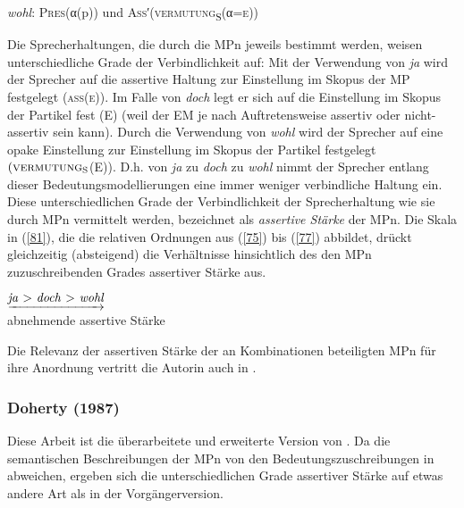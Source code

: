 \begin{exe}
	\ex\label{81} 
	\textit{wohl}: \textsc{Pres}(α(p)) und \textsc{Ass}′(\textsc{vermutung}\textsubscript{S}(α=\textsc{e}))
\end{exe}	
Die Sprecherhaltungen, die durch die MPn jeweils bestimmt werden, weisen unterschiedliche Grade der Verbindlichkeit auf: Mit der Verwendung von \textit{ja} wird der Sprecher auf die assertive Haltung zur Einstellung im Skopus der MP festgelegt (\textsc{ass}(\textsc{e})). Im Falle von \textit{doch} legt er sich auf die Einstellung im Skopus der Partikel fest (\textsc{E}) (weil der EM je nach Auftretensweise assertiv oder nicht-assertiv sein kann). Durch die Verwendung von \textit{wohl} wird der Sprecher auf eine opake Einstellung zur Einstellung im Skopus der Partikel festgelegt $(\textrm{\textsc{vermutung}}_{\textrm{S}}$(\textrm{\textsc{E}})). D.h. von \textit{ja} zu \textit{doch} zu \textit{wohl} nimmt der Sprecher entlang dieser Bedeutungsmodellierungen eine immer weniger verbindliche Haltung ein. Diese unterschiedlichen Grade der Verbindlichkeit der Sprecherhaltung wie sie durch MPn vermittelt werden, bezeichnet \citet[83]{Doherty1985} als \textit{assertive Stärke} der MPn. Die Skala in (\ref{81}), die die relativen Ordnungen aus (\ref{75}) bis (\ref{77}) abbildet, drückt gleichzeitig (absteigend) die Verhältnisse hinsichtlich des den MPn zuzu\-schreibenden Grades assertiver Stärke aus.

\begin{exe}
	\ex\label{82} 
	$\underrightarrow{\text{\textit{ja} > \textit{doch} > \textit{wohl}}}$\\
	abnehmende assertive Stärke
\end{exe}	
Die Relevanz der assertiven Stärke der an Kombinationen beteiligten MPn für ihre Anordnung vertritt die Autorin auch in \citet{Doherty1987}.

\subsubsection{Doherty (1987)}
Diese Arbeit ist die überarbeitete und erweiterte Version von \citet{Doherty1985}. Da die semantischen Beschreibungen der MPn von den Bedeutungszuschreibungen in \citet{Doherty1985} abweichen, ergeben sich die unterschiedlichen Grade assertiver Stärke auf etwas andere Art als in der Vorgängerversion.

